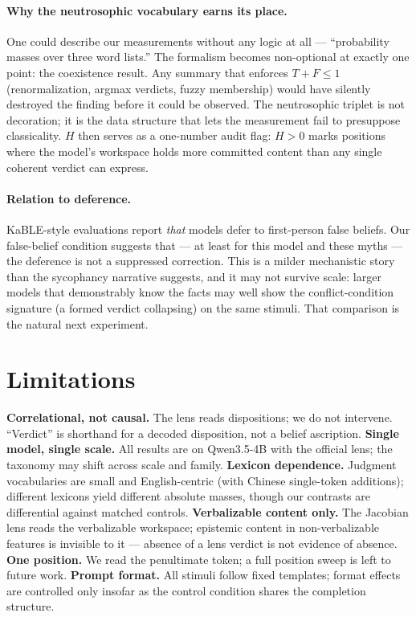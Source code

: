 \documentclass[11pt]{article}
\begin{document}
\paragraph{Why the neutrosophic vocabulary earns its place.} One could
describe our measurements without any logic at all --- ``probability masses
over three word lists.'' The formalism becomes non-optional at exactly one
point: the coexistence result. Any summary that enforces $T + F \le 1$
(renormalization, argmax verdicts, fuzzy membership) would have silently
destroyed the finding before it could be observed. The neutrosophic triplet is
not decoration; it is the data structure that lets the measurement fail to
presuppose classicality. $H$ then serves as a one-number audit flag: $H > 0$
marks positions where the model's workspace holds more committed content than
any single coherent verdict can express.

\paragraph{Relation to deference.} KaBLE-style evaluations report
\emph{that} models defer to first-person false beliefs. Our false-belief
condition suggests that --- at least for this model and these myths --- the
deference is not a suppressed correction. This is a milder mechanistic story
than the sycophancy narrative suggests, and it may not survive scale: larger
models that demonstrably know the facts may well show the conflict-condition
signature (a formed verdict collapsing) on the same stimuli. That comparison
is the natural next experiment.

\section{Limitations}\label{sec:limitations}

\textbf{Correlational, not causal.} The lens reads dispositions; we do not
intervene. ``Verdict'' is shorthand for a decoded disposition, not a belief
ascription. \textbf{Single model, single scale.} All results are on
Qwen3.5-4B with the official lens; the taxonomy may shift across scale and
family. \textbf{Lexicon dependence.} Judgment vocabularies are small and
English-centric (with Chinese single-token additions); different lexicons
yield different absolute masses, though our contrasts are differential
against matched controls. \textbf{Verbalizable content only.} The Jacobian
lens reads the verbalizable workspace; epistemic content in non-verbalizable
features is invisible to it --- absence of a lens verdict is not evidence of
absence. \textbf{One position.} We read the penultimate token; a full
position sweep is left to future work. \textbf{Prompt format.} All stimuli
follow fixed templates; format effects are controlled only insofar as the
control condition shares the completion structure.
\end{document}
